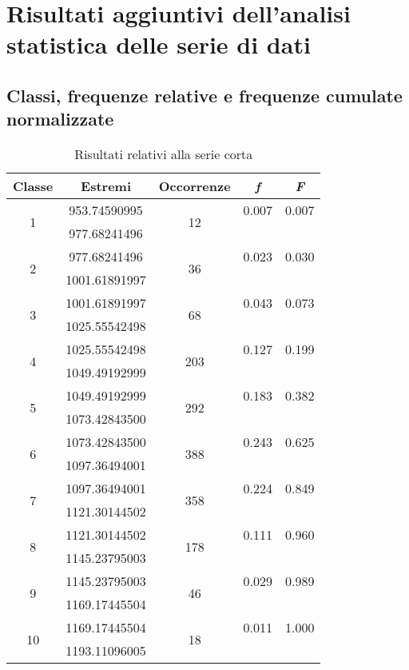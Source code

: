 \section{Risultati aggiuntivi dell'analisi statistica delle serie di dati}


\subsection{Classi, frequenze relative e frequenze cumulate normalizzate}

\begin{table}[H]
	\centering
	\begin{tabular}{c|c|c|c|c}
		\toprule
		\toprule
		\textbf{Classe} & \textbf{Estremi} & \textbf{Occorrenze} & \textbf{\textit{f}} & \textbf{\textit{F}} \\
		\midrule
		\midrule
		\multirow{2}{*}{1} & 953.74590995 & \multirow{2}{*}{12} & 0.007 & 0.007 \\
		& 977.68241496 & & & \\
		\midrule
		\multirow{2}{*}{2} & 977.68241496 & \multirow{2}{*}{36} & 0.023 & 0.030 \\
		&  1001.61891997& & & \\
		\midrule
		\multirow{2}{*}{3} & 1001.61891997 & \multirow{2}{*}{68} & 0.043 & 0.073 \\
		&  1025.55542498  & & & \\
		\midrule
		\multirow{2}{*}{4} & 1025.55542498 & \multirow{2}{*}{203} & 0.127 & 0.199 \\
		&1049.49192999& & & \\
		\midrule
		\multirow{2}{*}{5} & 1049.49192999 & \multirow{2}{*}{292} & 0.183 & 0.382 \\
		&  1073.42843500  & & & \\
		\midrule
		\multirow{2}{*}{6} & 1073.42843500 & \multirow{2}{*}{388} & 0.243 & 0.625 \\
		&  1097.36494001 & & & \\
		\midrule
		\multirow{2}{*}{7} & 1097.36494001 & \multirow{2}{*}{358} & 0.224 & 0.849 \\
		& 1121.30144502 & & & \\
		\midrule
		\multirow{2}{*}{8} & 1121.30144502 & \multirow{2}{*}{178} & 0.111 & 0.960 \\
		& 1145.23795003  & & & \\
		\midrule
		\multirow{2}{*}{9} & 1145.23795003 & \multirow{2}{*}{46} & 0.029 & 0.989 \\
		& 1169.17445504& & & \\
		\midrule
		\multirow{2}{*}{10} & 1169.17445504 & \multirow{2}{*}{18} & 0.011 & 1.000 \\
		& 1193.11096005 & & & \\
		\bottomrule
		\bottomrule
	\end{tabular}
	\caption{Risultati relativi alla serie corta}
	\label{tab:seriecorta}
\end{table}

